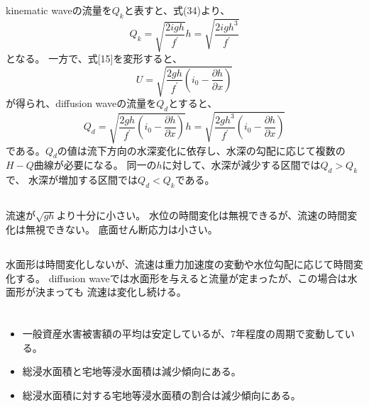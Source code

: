\documentclass[a4paper]{jsarticle}
\begin{document}
\subsection{}
kinematic waveの流量を$Q_k$と表すと、式(34)より、
\begin{equation}
  Q_k = \sqrt{\frac{2 i g h}{f^{\prime}}} h
  = \sqrt{\frac{2 i g h^3}{f^{\prime}}}
\end{equation}
となる。
一方で、式[15]を変形すると、
\begin{equation}
  U = \sqrt{\frac{2 g h}{f^{\prime}}
  \left(i_0 - \frac{\partial h}{\partial x}\right)}
\end{equation}
が得られ、diffusion waveの流量を$Q_d$とすると、
\begin{equation}
  Q_d = \sqrt{\frac{2 g h}{f^{\prime}}
  \left(i_0 - \frac{\partial h}{\partial x}\right)} h
  = \sqrt{\frac{2 g h^3}{f^{\prime}}
  \left(i_0 - \frac{\partial h}{\partial x}\right)}
\end{equation}
である。$Q_d$の値は流下方向の水深変化に依存し、水深の勾配に応じて複数の
$H-Q$曲線が必要になる。
同一の$h$に対して、水深が減少する区間では$Q_d > Q_k$で、
水深が増加する区間では$Q_d < Q_k$である。

\subsection{}
流速が$\sqrt{gh}$より十分に小さい。
水位の時間変化は無視できるが、流速の時間変化は無視できない。
底面せん断応力は小さい。

\subsection{}
水面形は時間変化しないが、流速は重力加速度の変動や水位勾配に応じて時間変化する。
diffusion waveでは水面形を与えると流量が定まったが、この場合は水面形が決まっても
流速は変化し続ける。

\section{}
\subsection{}
\subsubsection{}
\begin{itemize}
  \item 一般資産水害被害額の平均は安定しているが、7年程度の周期で変動している。
  \item 総浸水面積と宅地等浸水面積は減少傾向にある。
  \item 総浸水面積に対する宅地等浸水面積の割合は減少傾向にある。
\end{itemize}
\end{document}
